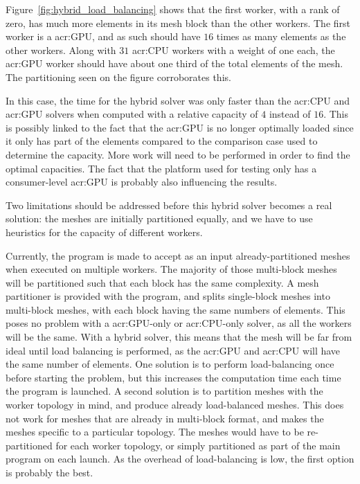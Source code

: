 Figure~\ref{fig:hybrid_load_balancing} shows that the first worker, with a rank of zero, has much
more elements in its mesh block than the other workers. The first worker is a \acrshort{acr:GPU},
and as such should have \(16\) times as many elements as the other workers. Along with \(31\)
\acrshort{acr:CPU} workers with a weight of one each, the \acrshort{acr:GPU} worker should have
about one third of the total elements of the mesh. The partitioning seen on the figure corroborates
this. 

In this case, the time for the hybrid solver was only faster than the \acrshort{acr:CPU} and
\acrshort{acr:GPU} solvers when computed with a relative capacity of \(4\) instead of \(16\). This
is possibly linked to the fact that the \acrshort{acr:GPU} is no longer optimally loaded since it
only has part of the elements compared to the comparison case used to determine the capacity. More
work will need to be performed in order to find the optimal capacities. The fact that the platform
used for testing only has a consumer-level \acrshort{acr:GPU} is probably also influencing the
results. 

Two limitations should be addressed before this hybrid solver becomes a real solution: the meshes
are initially partitioned equally, and we have to use heuristics for the capacity of different
workers. 

Currently, the program is made to accept as an input already-partitioned meshes when executed on
multiple workers. The majority of those multi-block meshes will be partitioned such that each block
has the same complexity. A mesh partitioner is provided with the program, and splits single-block
meshes into multi-block meshes, with each block having the same numbers of elements. This poses no
problem with a \acrshort{acr:GPU}-only or \acrshort{acr:CPU}-only solver, as all the workers will be
the same. With a hybrid solver, this means that the mesh will be far from ideal until load balancing
is performed, as the \acrshort{acr:GPU} and \acrshort{acr:CPU} will have the same number of
elements. One solution is to perform load-balancing once before starting the problem, but this
increases the computation time each time the program is launched. A second solution is to partition
meshes with the worker topology in mind, and produce already load-balanced meshes. This does not
work for meshes that are already in multi-block format, and makes the meshes specific to a
particular topology. The meshes would have to be re-partitioned for each worker topology, or simply
partitioned as part of the main program on each launch. As the overhead of load-balancing is low,
the first option is probably the best.

